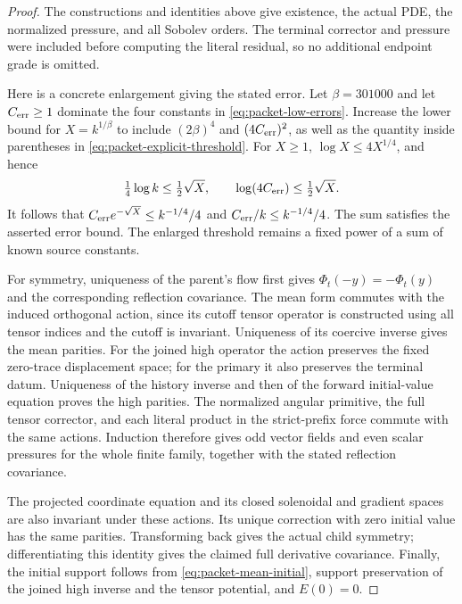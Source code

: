 \begin{proof}
The constructions and identities above give existence, the actual PDE,
the normalized pressure, and all Sobolev orders. The terminal corrector
and pressure were included before computing the literal residual, so
no additional endpoint grade is omitted.

Here is a concrete enlargement giving the stated error. Let
$\beta=301000$ and let $C_{\rm err}\ge1$ dominate the four constants in
\eqref{eq:packet-low-errors}. Increase the lower bound for $X=k^{1/\beta}$
to include $(2\beta)^4$ and $(4C_{\rm err})^2$, as well as the quantity
inside parentheses in \eqref{eq:packet-explicit-threshold}.
For $X\ge1$, $\log X\le4X^{1/4}$, and hence
\[
 \tfrac14\log k\le\tfrac12\sqrt X,
 \qquad \log(4C_{\rm err})\le\tfrac12\sqrt X.
\]
It follows that
$C_{\rm err}e^{-\sqrt X}\le k^{-1/4}/4$ and
$C_{\rm err}/k\le k^{-1/4}/4$. The sum satisfies the asserted error
bound. The enlarged threshold remains a fixed power of a sum of known
source constants.

For symmetry, uniqueness of the parent's flow first gives
$\Phi_t(-y)=-\Phi_t(y)$ and the corresponding reflection covariance.
The mean form commutes with the induced orthogonal action, since its
cutoff tensor operator is constructed using all tensor indices and the
cutoff is invariant. Uniqueness of its coercive inverse gives the mean
parities. For the joined high operator the action preserves the fixed
zero-trace displacement space; for the primary it also preserves the
terminal datum. Uniqueness of the history inverse and then of the
forward initial-value equation proves the high parities. The normalized
angular primitive, the full tensor corrector, and each literal product
in the strict-prefix force commute with the same actions. Induction
therefore gives odd vector fields and even scalar pressures for the
whole finite family, together with the stated reflection covariance.

The projected coordinate equation and its closed solenoidal and gradient
spaces are also invariant under these actions. Its unique correction
with zero initial value has the same parities. Transforming back gives
the actual child symmetry; differentiating this identity gives the
claimed full derivative covariance. Finally, the initial support
follows from \eqref{eq:packet-mean-initial}, support preservation of the
joined high inverse and the tensor potential, and $E(0)=0$.
\end{proof}
